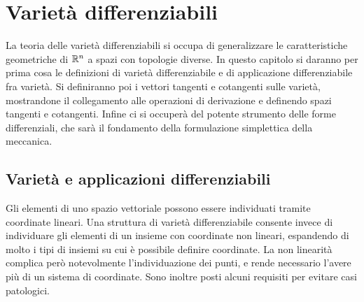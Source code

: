 \chapter{Varietà differenziabili}
La teoria delle varietà differenziabili si occupa di generalizzare le caratteristiche geometriche di $\mathbb{R}^n$ a spazi con topologie diverse. In questo capitolo si daranno per prima cosa le definizioni di varietà differenziabile e di applicazione differenziabile fra varietà. Si definiranno poi i vettori tangenti e cotangenti sulle varietà, mostrandone il collegamento alle operazioni di derivazione e definendo spazi tangenti e cotangenti. Infine ci si occuperà del potente strumento delle forme differenziali, che sarà il fondamento della formulazione simplettica della meccanica.

\section{Varietà e applicazioni differenziabili} \label{sec:smoothMfd}
Gli elementi di uno spazio vettoriale possono essere individuati tramite coordinate lineari. Una struttura di varietà differenziabile consente invece di individuare gli elementi di un insieme con coordinate non lineari, espandendo di molto i tipi di insiemi su cui è possibile definire coordinate. La non linearità complica però notevolmente l'individuazione dei punti, e rende necessario l'avere più di un sistema di coordinate. Sono inoltre posti alcuni requisiti per evitare casi patologici.

